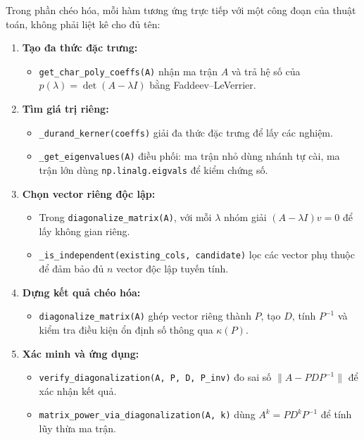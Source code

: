 \documentclass[a4paper]{article}
\begin{document}
Trong phần chéo hóa, mỗi hàm tương ứng trực tiếp với một công đoạn của thuật toán, không phải liệt kê cho đủ tên:
\begin{enumerate}
    \item \textbf{Tạo đa thức đặc trưng:}
    \begin{itemize}
        \item \texttt{get\_char\_poly\_coeffs(A)} nhận ma trận $A$ và trả hệ số của $p(\lambda)=\det(A-\lambda I)$ bằng Faddeev--LeVerrier.
    \end{itemize}

    \item \textbf{Tìm giá trị riêng:}
    \begin{itemize}
        \item \texttt{\_durand\_kerner(coeffs)} giải đa thức đặc trưng để lấy các nghiệm.
        \item \texttt{\_get\_eigenvalues(A)} điều phối: ma trận nhỏ dùng nhánh tự cài, ma trận lớn dùng \texttt{np.linalg.eigvals} để kiểm chứng số.
    \end{itemize}

    \item \textbf{Chọn vector riêng độc lập:}
    \begin{itemize}
        \item Trong \texttt{diagonalize\_matrix(A)}, với mỗi $\lambda$ nhóm giải $(A-\lambda I)v=0$ để lấy không gian riêng.
        \item \texttt{\_is\_independent(existing\_cols, candidate)} lọc các vector phụ thuộc để đảm bảo đủ $n$ vector độc lập tuyến tính.
    \end{itemize}

    \item \textbf{Dựng kết quả chéo hóa:}
    \begin{itemize}
        \item \texttt{diagonalize\_matrix(A)} ghép vector riêng thành $P$, tạo $D$, tính $P^{-1}$ và kiểm tra điều kiện ổn định số thông qua \(\kappa(P)\).
    \end{itemize}

    \item \textbf{Xác minh và ứng dụng:}
    \begin{itemize}
        \item \texttt{verify\_diagonalization(A, P, D, P\_inv)} đo sai số \(\|A-PDP^{-1}\|\) để xác nhận kết quả.
        \item \texttt{matrix\_power\_via\_diagonalization(A, k)} dùng $A^k=PD^kP^{-1}$ để tính lũy thừa ma trận.
    \end{itemize}
\end{enumerate}
\end{document}
